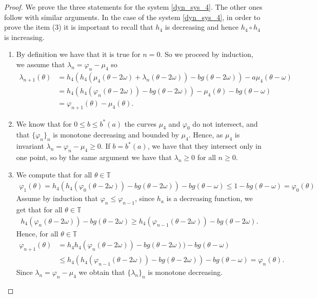 \documentclass[12pt]{article}
\newcommand{\T}{\mathbb{T}}
\theoremstyle{plain}
\theoremstyle{remark}
\theoremstyle{definition}
\begin{document}
\begin{proof}
    We prove the three statements for the system \eqref{dyn_sys_4}. The other ones follow with similar arguments. In the case of the system \eqref{dyn_sys_4}, in order to prove the item (3) it is important to recall that $h_4$ is decreasing and hence $h_4\circ h_4$ is increasing.
    \begin{enumerate}
        \item By definition we have that it is true for $n=0$. So we proceed by induction, we assume that $\lambda_n = \varphi_n-\mu_4$ so
        \begin{align*}
            \lambda_{n+1}(\theta) &= h_4(h_{4}(\mu_4(\theta-2\omega)+\lambda_n(\theta-2\omega)) - b g(\theta-2\omega)) - a\mu_4(\theta-\omega)\\
            &= h_4(h_{4}(\varphi_n(\theta-2\omega)) - b g(\theta-2\omega)) - \mu_4(\theta) - b g(\theta-\omega)\\
            &= \varphi_{n+1}(\theta)-\mu_4(\theta).
        \end{align*}

        \item We know that for $0\leq b\leq b^*(a)$ the curves $\mu_4$ and $\varphi_0$ do not intersect, and that $\{\varphi_n\}_n$ is monotone decreasing and bounded by $\mu_4$. Hence, as $\mu_4$ is invariant $\lambda_n = \varphi_n-\mu_4\geq0$. If $b = b^*(a)$, we have that they intersect only in one point, so by the same argument we have that $\lambda_n\geq0$ for all $n\geq0$.
        
        \item We compute that for all $\theta\in\T$
        \begin{align*}
            \varphi_{1}(\theta) = h_4(h_{4}(\varphi_0(\theta-2\omega)) - b g(\theta-2\omega)) - b g(\theta-\omega) \leq 1 - b g(\theta-\omega) = \varphi_0(\theta)
        \end{align*}
        Assume by induction that $\varphi_{n}\leq\varphi_{n-1}$, since $h_a$ is a decreasing function, we get that for all $\theta\in\T$
        \begin{align*}
            h_{4}(\varphi_n(\theta-2\omega)) - b g(\theta-2\omega)\geq h_{4}(\varphi_{n-1}(\theta-2\omega)) - b g(\theta-2\omega).
        \end{align*}
        Hence, for all $\theta\in\T$
        \begin{align*}
            \varphi_{n+1}(\theta) &= h_4 h_{4}(\varphi_n(\theta-2\omega)) - b g(\theta-2\omega)) - b g(\theta-\omega) \\
            &\leq h_4(h_{4}(\varphi_{n-1}(\theta-2\omega)) - b g(\theta-2\omega)) - b g(\theta-\omega) = \varphi_{n}(\theta).
        \end{align*}
        Since $\lambda_n = \varphi_n-\mu_4$ we obtain that $\{\lambda_n\}_n$ is monotone decreasing.
    \end{enumerate}
\end{proof}
\end{document}
